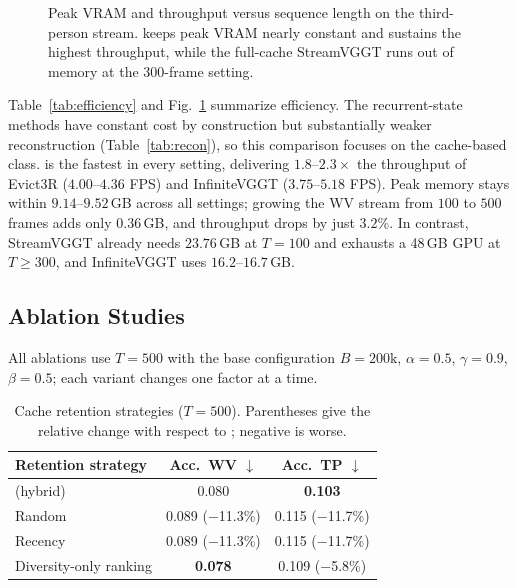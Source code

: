 \begin{figure}[t]
    \centering
    
    \caption{Peak VRAM and throughput versus sequence length on the third-person stream. \method{} keeps peak VRAM nearly constant and sustains the highest throughput, while the full-cache StreamVGGT runs out of memory at the 300-frame setting.}
    \label{fig:efficiency}
\end{figure}

Table~\ref{tab:efficiency} and Fig.~\ref{fig:efficiency} summarize efficiency. The recurrent-state methods have constant cost by construction but substantially weaker reconstruction (Table~\ref{tab:recon}), so this comparison focuses on the cache-based class. \method{} is the fastest in every setting, delivering $1.8$--$2.3\times$ the throughput of Evict3R ($4.00$--$4.36$ FPS) and InfiniteVGGT ($3.75$--$5.18$ FPS). Peak memory stays within $9.14$--$9.52$\,GB across all settings; growing the WV stream from $100$ to $500$ frames adds only $0.36$\,GB, and throughput drops by just $3.2$\%. In contrast, StreamVGGT already needs $23.76$\,GB at $T{=}100$ and exhausts a 48\,GB GPU at $T{\geq}300$, and InfiniteVGGT uses $16.2$--$16.7$\,GB.

\subsection{Ablation Studies}
\label{sec:exp-ablation}

All ablations use $T{=}500$ with the base configuration $B{=}200\mathrm{k}$, $\alpha{=}0.5$, $\gamma{=}0.9$, $\beta{=}0.5$; each variant changes one factor at a time.

\begin{table}[t]
    \centering
    \caption{Cache retention strategies ($T{=}500$). Parentheses give the relative change with respect to \method{}; negative is worse.}
    \label{tab:ab-retention}
    \tabletext
    \setlength{\tabcolsep}{4pt}
    \begin{tabular}{lcc}
        \toprule
        Retention strategy & Acc.\ WV $\downarrow$ & Acc.\ TP $\downarrow$ \\
        \midrule
        \method{} (hybrid)   & 0.080 & \textbf{0.103} \\
        Random               & 0.089 ($-$11.3\%) & 0.115 ($-$11.7\%) \\
        Recency              & 0.089 ($-$11.3\%) & 0.115 ($-$11.7\%) \\
        Diversity-only ranking & \textbf{0.078} & 0.109 ($-$5.8\%) \\
        \bottomrule
    \end{tabular}
\end{table}


